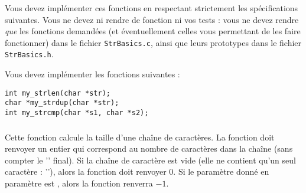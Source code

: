 

\vspace*{0.7cm}

\noindent {}

\bigskip

\noindent Vous devez implémenter ces fonctions en respectant strictement les spécifications suivantes.
Vous ne devez ni rendre de fonction  ni vos tests : vous ne devez rendre \textit{que} les fonctions demandées (et éventuellement celles vous permettant de les faire fonctionner) dans le fichier \texttt{StrBasics.c}, ainsi que leurs prototypes dans le fichier \texttt{StrBasics.h}.

\bigskip


\noindent Vous devez implémenter les fonctions suivantes :

\bigskip

\lstset{language=C}
\begin{lstlisting}[frame=single]
int my_strlen(char *str);
char *my_strdup(char *str);
int my_strcmp(char *s1, char *s2);
\end{lstlisting}


\subsubsection*{}

\noindent Cette fonction calcule la taille d'une chaîne de caractères.
La fonction doit renvoyer un entier qui correspond au nombre de caractères dans la chaîne (sans compter le '' final).
Si la chaîne de caractère est vide (elle ne contient qu'un seul caractère : ''), alors la fonction doit renvoyer $ 0 $.
Si le paramètre donné en paramètre est , alors la fonction renverra $ -1 $.


